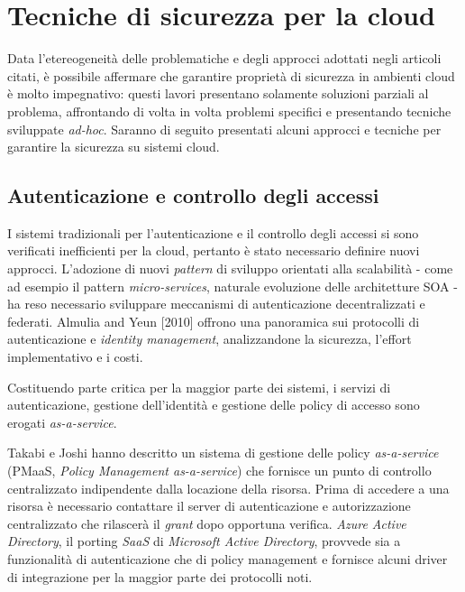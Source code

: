 \documentclass[../main.tex]{subfiles}
\begin{document}
\section{Tecniche di sicurezza per la cloud}
Data l'etereogeneità delle problematiche e degli approcci adottati negli articoli citati, è possibile affermare che garantire proprietà di sicurezza in ambienti cloud è molto impegnativo: questi lavori presentano solamente soluzioni parziali al problema, affrontando di volta in volta problemi specifici e presentando tecniche sviluppate \textit{ad-hoc}\cite{Ardagna:2015:SAC:2808687.2767005}.
Saranno di seguito presentati alcuni approcci e tecniche per garantire la sicurezza su sistemi cloud.

\subsection{Autenticazione e controllo degli accessi}
I sistemi tradizionali per l'autenticazione e il controllo degli accessi si sono verificati inefficienti per la cloud, pertanto è stato necessario definire nuovi approcci. L'adozione di nuovi \textit{pattern} di sviluppo orientati alla scalabilità - come ad esempio il pattern \textit{micro-services}, naturale evoluzione delle architetture SOA - ha reso necessario sviluppare meccanismi di autenticazione decentralizzati e federati.
Almulia and Yeun [2010] offrono una panoramica sui protocolli di autenticazione e \textit{identity management}, analizzandone la sicurezza, l'effort implementativo e i costi\cite{Ieee5542654}.

Costituendo parte critica per la maggior parte dei sistemi, i servizi di autenticazione, gestione dell'identità e gestione delle policy di accesso sono erogati \textit{as-a-service}.

Takabi e Joshi hanno descritto un sistema di gestione delle policy \textit{as-a-service} (PMaaS, \textit{Policy Management as-a-service}) che fornisce un punto di controllo centralizzato indipendente dalla locazione della risorsa\cite{pittir13526}.
Prima di accedere a una risorsa è necessario contattare il server di autenticazione e autorizzazione centralizzato che rilascerà il \textit{grant} dopo opportuna verifica.
\textit{Azure Active Directory}, il porting \textit{SaaS} di \textit{Microsoft Active Directory}, provvede sia a funzionalità di autenticazione che di policy management e fornisce alcuni driver di integrazione per la maggior parte dei protocolli noti.
\end{document}
